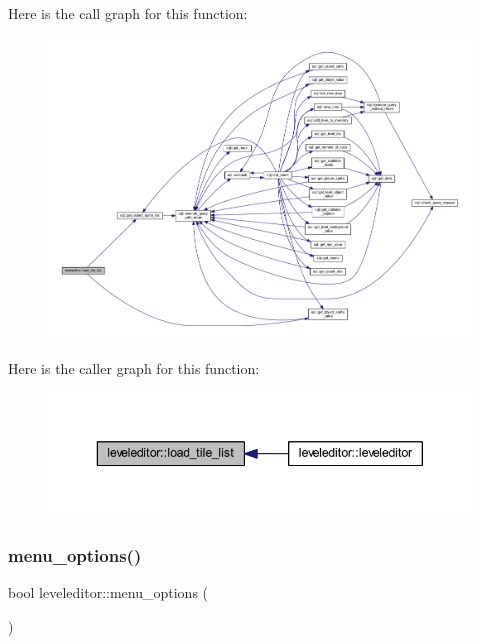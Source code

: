 Here is the call graph for this function\+:
\nopagebreak
\begin{figure}[H]
\begin{center}
\leavevmode
\includegraphics[width=350pt]{classleveleditor_ad34dad62ef7c5ea26250b97e9803776a_cgraph}
\end{center}
\end{figure}
Here is the caller graph for this function\+:
\nopagebreak
\begin{figure}[H]
\begin{center}
\leavevmode
\includegraphics[width=343pt]{classleveleditor_ad34dad62ef7c5ea26250b97e9803776a_icgraph}
\end{center}
\end{figure}
\mbox{\label{classleveleditor_aa44f48b9869b3d5e0ce0429c6916e2b9}} 
\subsubsection{\texorpdfstring{menu\+\_\+options()}{menu\_options()}}
{\footnotesize\ttfamily bool leveleditor\+::menu\+\_\+options (\begin{DoxyParamCaption}{ }\end{DoxyParamCaption})\hspace{0.3cm}{\ttfamily [private]}}



